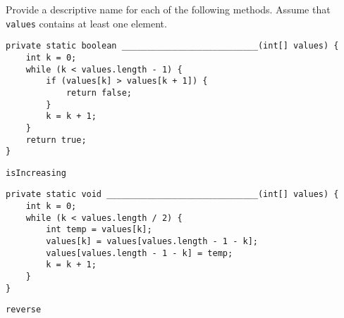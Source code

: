 \begin{blocksection}
\question Provide a descriptive name for each of the following methods. Assume
that \lstinline$values$ contains at least one element.

\begin{lstlisting}
private static boolean ___________________________(int[] values) {
    int k = 0;
    while (k < values.length - 1) {
        if (values[k] > values[k + 1]) {
            return false;
        }
        k = k + 1;
    }
    return true;
}
\end{lstlisting}

\begin{solution}
\texttt{isIncreasing}
\end{solution}

\begin{lstlisting}
private static void ______________________________(int[] values) {
    int k = 0;
    while (k < values.length / 2) {
        int temp = values[k];
        values[k] = values[values.length - 1 - k];
        values[values.length - 1 - k] = temp;
        k = k + 1;
    }
}
\end{lstlisting}

\begin{solution}
\texttt{reverse}
\end{solution}
\end{blocksection}
